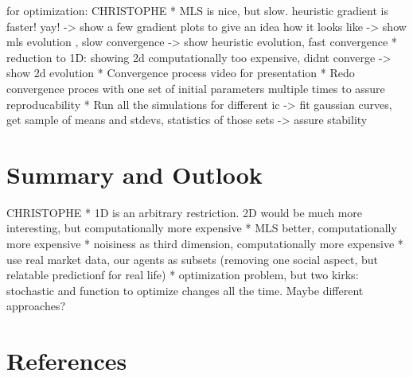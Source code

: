 \documentclass[11pt]{article}
\begin{document}
for optimization: CHRISTOPHE
* MLS is nice, but slow. heuristic gradient is faster! yay!
  -> show a few gradient plots to give an idea how it looks like
  -> show mls evolution , slow convergence
  -> show heuristic evolution, fast convergence
* reduction to 1D: showing 2d computationally too expensive, didnt converge
  -> show 2d evolution
* Convergence process video for presentation
* Redo convergence proces with one set of initial parameters multiple times to assure reproducability
* Run all the simulations for different ic -> fit gaussian curves, get sample of means and stdevs, statistics of those sets
  -> assure stability

\section{Summary and Outlook}
CHRISTOPHE
* 1D is an arbitrary restriction. 2D would be much more interesting, but computationally more expensive
* MLS better, computationally more expensive
* noisiness as third dimension, computationally more expensive
* use real market data, our agents as subsets (removing one social aspect, but relatable predictionf for real life)
* optimization problem, but two kirks: stochastic and function to optimize changes all the time. Maybe different approaches?

\section{References}
\end{document}
